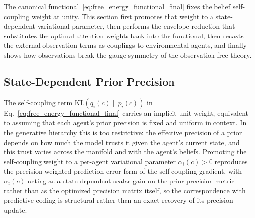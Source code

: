 \documentclass[11pt]{article}
\begin{document}
The canonical functional~\eqref{eq:free_energy_functional_final} fixes the belief self-coupling weight at unity. This section first promotes that weight to a state-dependent variational parameter, then performs the envelope reduction that substitutes the optimal attention weights back into the functional, then recasts the external observation terms as couplings to environmental agents, and finally shows how observations break the gauge symmetry of the observation-free theory.

\subsection{State-Dependent Prior Precision}
\label{sec:state_dependent_precision}

The self-coupling term $\mathrm{KL}(q_i(c)\|p_i(c))$ in Eq.~\eqref{eq:free_energy_functional_final} carries an implicit unit weight, equivalent to assuming that each agent's prior precision is fixed and uniform in context. In the generative hierarchy this is too restrictive: the effective precision of a prior depends on how much the model trusts it given the agent's current state, and this trust varies across the manifold and with the agent's beliefs. Promoting the self-coupling weight to a per-agent variational parameter $\alpha_i(c) > 0$ reproduces the precision-weighted prediction-error form of the self-coupling gradient, with $\alpha_i(c)$ acting as a state-dependent scalar gain on the prior-precision metric rather than as the optimized precision matrix itself, so the correspondence with predictive coding is structural rather than an exact recovery of its precision update.
\end{document}
